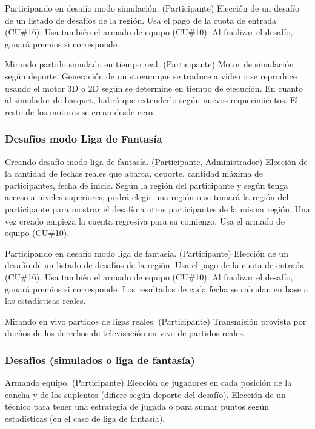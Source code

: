 {Participando en desafío modo simulación. (Participante)}
{Elección de un desafío de un listado de desafíos de la región. Usa el pago de la cuota de entrada (CU\#16). Usa también el armado de equipo (CU\#10). Al finalizar el desafío, ganará premios si corresponde.}

{Mirando partido simulado en tiempo real. (Participante)}
{Motor de simulación según deporte. Generación de un stream que se traduce a video o se reproduce usando el motor 3D o 2D según se determine en tiempo de ejecución. En cuanto al simulador de basquet, habrá que extenderlo según nuevos requerimientos. El resto de los motores se crean desde cero.}

\subsubsection{Desafíos modo Liga de Fantasía}

{Creando desafío modo liga de fantasía. (Participante, Administrador)}
{Elección de la cantidad de fechas reales que abarca, deporte, cantidad máxima de participantes, fecha de inicio. Según la región del participante y según tenga acceso a niveles superiores, podrá elegir una región o se tomará la región del participante para mostrar el desafío a otros participantes de la misma región. Una vez creado empieza la cuenta regresiva para su comienzo. Usa el armado de equipo (CU\#10).}

{Participando en desafío modo liga de fantasía. (Participante)}
{Elección de un desafío de un listado de desafíos de la región. Usa el pago de la cuota de entrada (CU\#16). Usa también el armado de equipo (CU\#10). Al finalizar el desafío, ganará premios si corresponde. Los resultados de cada fecha se calculan en base a las estadísticas reales.}

{Mirando en vivo partidos de ligas reales. (Participante)}
{Transmisión provista por dueños de los derechos de televisación en vivo de partidos reales.}


\subsubsection{Desafíos (simulados o liga de fantasía)}

{Armando equipo. (Participante)}
{Elección de jugadores en cada posición de la cancha y de los suplentes (difiere según deporte del desafío). Elección de un técnico para tener una estrategia de jugada o para sumar puntos según estadísticas (en el caso de liga de fantasía).}

